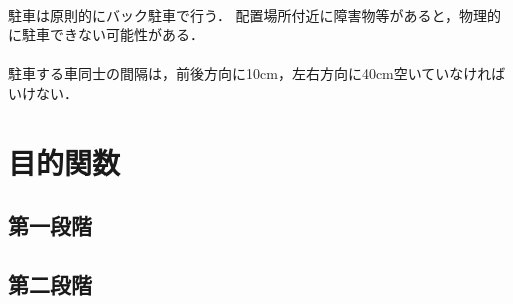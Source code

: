 \\
駐車は原則的にバック駐車で行う．
配置場所付近に障害物等があると，物理的に駐車できない可能性がある．\\

\\
駐車する車同士の間隔は，前後方向に10cm，左右方向に40cm空いていなければいけない．\\


\section{目的関数}
\subsection*{第一段階}
\subsection*{第二段階}